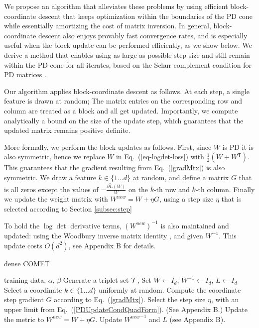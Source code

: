 \documentclass[twoside,11pt]{article}
\newcommand\mat[1]{{#1}}
\newcommand{\T}{{}^\mathsf{T}}
\newcommand{\W}{\mat{W}}
\newcommand{\newW}{{\mat{W^{new}}}}
\newcommand{\tL}{\tilde{L}(\W)}
\newcommand{\cholL}{\mat{L}}
\newcommand{\grd}{\frac{\partial \tL}{\W}}
\renewcommand{\eqref}[1]{Eq.~(\ref{#1})}
\begin{document}
We propose an algorithm that alleviates these problems by using efficient block-coordinate descent that keeps optimization within the boundaries of the PD cone while essentially amortizing the cost of matrix inversion.
In general, block-coordinate descent also enjoys provably fast convergence rates, and is especially useful when the block update can be performed efficiently, as we show below. We derive a method that enables using as large as possible step size and still remain within the PD cone for all iterates, based on the Schur complement condition for PD matrices \citep[p. 650]{boyd2004convex}.

Our algorithm applies block-coordinate descent as follows. At each step, a single feature is drawn at random; The matrix entries on the corresponding row and column are treated as a block and all get updated. Importantly, we compute analytically a bound on the size of the update step, which guarantees that the updated matrix remains positive definite. %

More formally, we perform the block updates as follows. First, since $\W$ is PD it is also symmetric, hence we replace $\W$ in \eqref{eq-logdet-loss} with $\tfrac{1}{2}(\W + \W\T)$. This guarantees that the gradient resulting from \eqref{gradMtx} is also symmetric. We draw a feature $k \in \{1 \ldots d$\} at random, and define a matrix $\mat{G}$ that is all zeros except the values of $-\grd$ on the $k$-th row and $k$-th column. Finally we update the weight matrix with $\newW = \W +\eta \mat{G}$, using a step size $\eta$ that is selected according to Section \ref{subsec:step}

To hold the $\log\det$ derivative terms, $(\newW)^{-1}$ is also maintained and updated: using the Woodbury inverse matrix identity \citep{woodbury1950inverting}, and given $\W^{-1}$. This update costs $O(d^2)$, see Appendix B for details.

\begin{algorithm}[th]
   \caption{dense COMET}
   \label{alg:comet}
\begin{algorithmic}[1]
    training data, $\alpha$, $\beta$
   \STATE Generate a triplet set $\cal{T}$, Set  $\W  \leftarrow I_d$, $\W^{-1}  \leftarrow I_d$, $\cholL  \leftarrow I_d$
   \REPEAT 
   \STATE Select a coordinate $k \in \{1 \ldots d\}$ uniformly at random.
   \STATE Compute the coordinate step gradient $\mat{G}$ according to \eqref{gradMtx}.
   \STATE Select the step size $\eta$, with an upper limit from \eqref{PDUpdateCondQuadForm}. (See Appendix B.)
   \STATE Update the metric to $\newW=\W+\eta G$.
   \STATE Update $\newW^{-1}$ and $\cholL$ (see Appendix B).
\end{algorithmic}
\end{algorithm}
\end{document}
